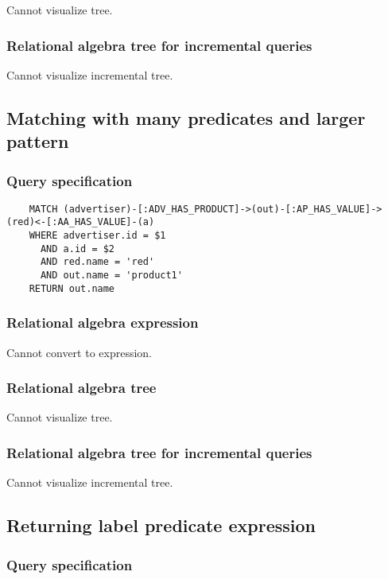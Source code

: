 	Cannot visualize tree.

	\subsubsection*{Relational algebra tree for incremental queries}

	Cannot visualize incremental tree.
	\subsection{Matching with many predicates and larger pattern}

	\subsubsection*{Query specification}

	\begin{lstlisting}
	MATCH (advertiser)-[:ADV_HAS_PRODUCT]->(out)-[:AP_HAS_VALUE]->(red)<-[:AA_HAS_VALUE]-(a)
	WHERE advertiser.id = $1
	  AND a.id = $2
	  AND red.name = 'red'
	  AND out.name = 'product1'
	RETURN out.name
	\end{lstlisting}


	\subsubsection*{Relational algebra expression}

	Cannot convert to expression.

	\subsubsection*{Relational algebra tree}

	Cannot visualize tree.

	\subsubsection*{Relational algebra tree for incremental queries}

	Cannot visualize incremental tree.
	\subsection{Returning label predicate expression}

	\subsubsection*{Query specification}

